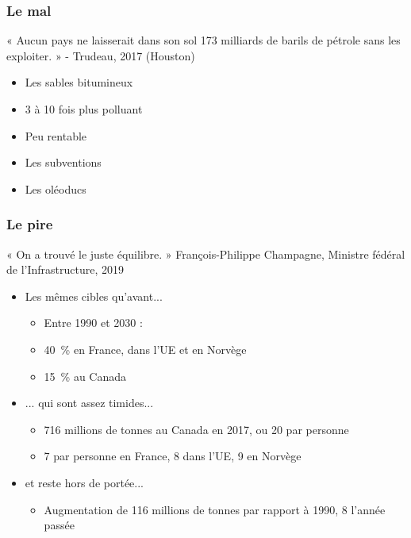 \documentclass[14pt]{beamer}
\begin{document}
	\begin{frame}
		\frametitle{Le mal} 
	« Aucun pays ne laisserait dans son sol 173 milliards de barils de pétrole sans les exploiter. » - Trudeau, 2017 (Houston)
	
	\bigskip

		\begin{itemize}
			\pause
			\item Les sables bitumineux %
			\pause
			\item 3 à 10 fois plus polluant %
			\pause
			\item Peu rentable %
			\pause
			\item Les subventions %
			\pause
			\item Les oléoducs %
		\end{itemize}
	\end{frame}


	\begin{frame}
		\frametitle{Le pire}
		« On a trouvé le juste équilibre. » François-Philippe Champagne, Ministre fédéral de l’Infrastructure, 2019
		
		\bigskip

		\begin{itemize}
			\pause
			\item Les mêmes cibles qu'avant...
			\begin{itemize}
				\pause
				\item Entre 1990 et 2030 :
				\pause
				\item 40~\% en France, dans l'UE et en Norvège  
				\pause
				\item 15~\% au Canada
			\end{itemize}
			\pause
			\item ... qui sont assez timides... 
			\begin{itemize}
				\pause
				\item 716 millions de tonnes au Canada en 2017, ou 20 par personne
				\pause
				\item 7 par personne en France, 8 dans l'UE, 9 en Norvège
			\end{itemize}
			\pause
			\item et reste hors de portée...  
			\begin{itemize}
				\pause
					\item Augmentation de 116 millions de tonnes par rapport à 1990, 8 l'année passée
			\end{itemize}
		\end{itemize}
	\end{frame}
\end{document}
